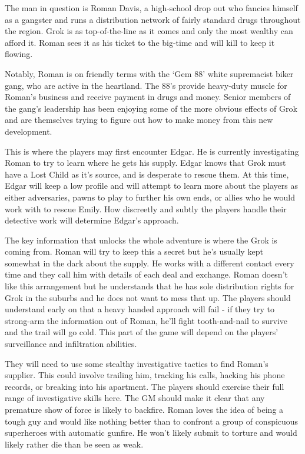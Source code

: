 \documentclass[letterpaper,serif]{rpg-module}
\begin{document}
The man in question is Roman Davis, a high-school drop out who fancies himself as a gangster and runs a distribution network of fairly standard drugs throughout the region. Grok is as top-of-the-line as it comes and only the most wealthy can afford it. Roman sees it as his ticket to the big-time and will kill to keep it flowing. 

Notably, Roman is on friendly terms with the `Gem 88' white supremacist biker gang, who are active in the heartland. The 88's provide heavy-duty muscle for Roman's business and receive payment in drugs and money. Senior members of the gang's leadership has been enjoying some of the more obvious effects of Grok and are themselves trying to figure out how to make money from this new development.    

This is where the players may first encounter Edgar. He is currently investigating Roman to try to learn where he gets his supply. Edgar knows that Grok must have a Lost Child as it's source, and is desperate to rescue them. At this time, Edgar will keep a low profile and will attempt to learn more about the players as either adversaries, pawns to play to further his own ends, or allies who he would work with to rescue Emily. How discreetly and subtly the players handle their detective work will determine Edgar's approach.  

The key information that unlocks the whole adventure is where the Grok is coming from. Roman will try to keep this a secret but he's usually kept somewhat in the dark about the supply. He works with a different contact every time and they call him with details of each deal and exchange. Roman doesn't like this arrangement but he understands that he has sole distribution rights for Grok in the suburbs and he does not want to mess that up. The players should understand early on that a heavy handed approach will fail - if they try to strong-arm the information out of Roman, he'll fight tooth-and-nail to survive and the trail will go cold. This part of the game will depend on the players' surveillance and infiltration abilities. 

They will need to use some stealthy investigative tactics to find Roman's supplier. This could involve trailing him, tracking his calls, hacking his phone records, or breaking into his apartment. The players should exercise their full range of investigative skills here. The GM should make it clear that any premature show of force is likely to backfire. Roman loves the idea of being a tough guy and would like nothing better than to confront a group of conspicuous superheroes with automatic gunfire. He won't likely submit to torture and would likely rather die than be seen as weak. 
\end{document}
